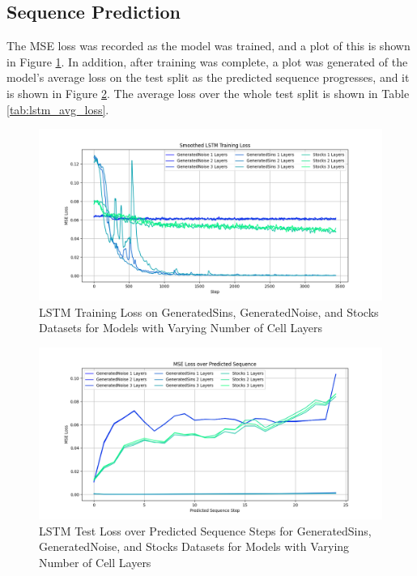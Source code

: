 \documentclass{scrartcl}
\begin{document}
\subsection{Sequence Prediction}
\label{subsec:experiment_sp}

The MSE loss was recorded as the model was trained, and a plot of this is shown
in Figure \ref{plt:lstm_train_loss}. In addition, after training was complete,
a plot was generated of the model's average loss on the test split as the
predicted sequence progresses, and it is shown in Figure
\ref{plt:lstm_seq_loss}. The average loss over the whole test split is shown in
Table \ref{tab:lstm_avg_loss}.

\begin{figure}[H]
	\begin{center}
		\includegraphics[width=1\textwidth]{plots/lstm_train_loss.png}
	\end{center}
	\caption{LSTM Training Loss on GeneratedSins, GeneratedNoise, and Stocks
	Datasets for Models with Varying Number of Cell Layers}
	\label{plt:lstm_train_loss}
\end{figure}

\begin{figure}[H]
	\begin{center}
		\includegraphics[width=1\textwidth]{plots/lstm_seq_loss.png}
	\end{center}
	\caption{LSTM Test Loss over Predicted Sequence Steps for GeneratedSins, GeneratedNoise, and Stocks Datasets for Models 
	with Varying Number of Cell Layers}
	\label{plt:lstm_seq_loss}
\end{figure}
\end{document}
